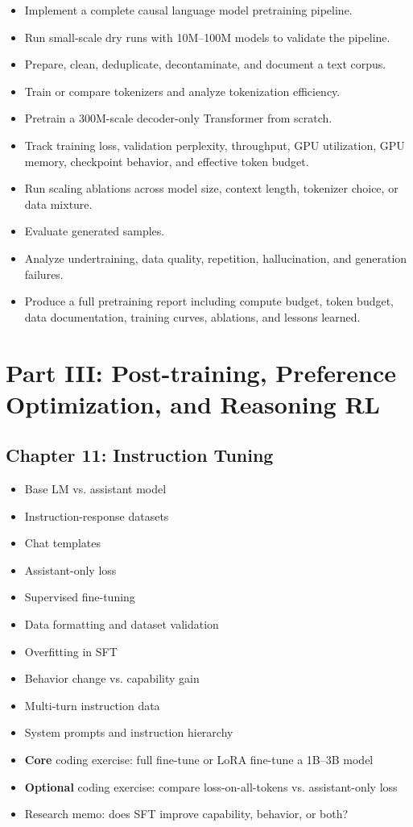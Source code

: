 \documentclass[11pt]{article}
\begin{document}
\begin{itemize}
    \item Implement a complete causal language model pretraining pipeline.
    \item Run small-scale dry runs with 10M--100M models to validate the pipeline.
    \item Prepare, clean, deduplicate, decontaminate, and document a text corpus.
    \item Train or compare tokenizers and analyze tokenization efficiency.
    \item Pretrain a 300M-scale decoder-only Transformer from scratch.
    \item Track training loss, validation perplexity, throughput, GPU utilization, GPU memory, checkpoint behavior, and effective token budget.
    \item Run scaling ablations across model size, context length, tokenizer choice, or data mixture.
    \item Evaluate generated samples.
    \item Analyze undertraining, data quality, repetition, hallucination, and generation failures.
    \item Produce a full pretraining report including compute budget, token budget, data documentation, training curves, ablations, and lessons learned.
\end{itemize}

\section{Part III: Post-training, Preference Optimization, and Reasoning RL}

\subsection{Chapter 11: Instruction Tuning}

\begin{itemize}
    \item Base LM vs. assistant model
    \item Instruction-response datasets
    \item Chat templates
    \item Assistant-only loss
    \item Supervised fine-tuning
    \item Data formatting and dataset validation
    \item Overfitting in SFT
    \item Behavior change vs. capability gain
    \item Multi-turn instruction data
    \item System prompts and instruction hierarchy
    \item \textbf{Core} coding exercise: full fine-tune or LoRA fine-tune a 1B--3B model
    \item \textbf{Optional} coding exercise: compare loss-on-all-tokens vs. assistant-only loss
    \item Research memo: does SFT improve capability, behavior, or both?
\end{itemize}
\end{document}

